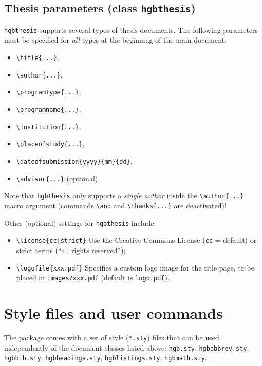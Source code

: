 \documentclass[english]{hgbarticle}
\begin{document}
\subsection{Thesis parameters (class \texttt{hgbthesis})}

\texttt{hgbthesis} supports several types of thesis documents. The following
parameters must be specified for \emph{all} types at the beginning of the
main document:
%
\begin{itemize}
    \item \verb!\title{...}!,
    \item \verb!\author{...}!,
    \item \verb!\programtype{...}!,
    \item \verb!\programname{...}!,
    \item \verb!\institution{...}!,
    \item \verb!\placeofstudy{...}!,
    \item \verb!\dateofsubmission{yyyy}{mm}{dd}!,
    \item \verb!\advisor{...}! (optional),
\end{itemize}
%
Note that \texttt{hgbthesis} only supports a \emph{single author} inside the
\verb!\author{...}! macro argument (commands \verb!\and! and
\verb!\thanks{...}! are deactivated)!


Other (optional) settings for \texttt{hgbthesis} include:
\begin{itemize}
    \item \verb!\license{cc|strict}!\newline
    Use the Creative Commons License (\texttt{cc} = default) or strict terms
      (``all rights reserved'');
    \item \verb!\logofile{xxx.pdf}!\newline
    Specifies a custom logo image for the title page, to be placed in \verb!images/xxx.pdf!
    (default is \texttt{logo.pdf}).
\end{itemize}

\section{Style files and user commands}

The package comes with a set of style (\texttt{*.sty}) files that can be used
independently of the document classes listed above:
\texttt{hgb.sty},
\texttt{hgbabbrev.sty},
\texttt{hgbbib.sty},
\texttt{hgbheadings.sty},
\texttt{hgblistings.sty},
\texttt{hgbmath.sty}.
\end{document}
